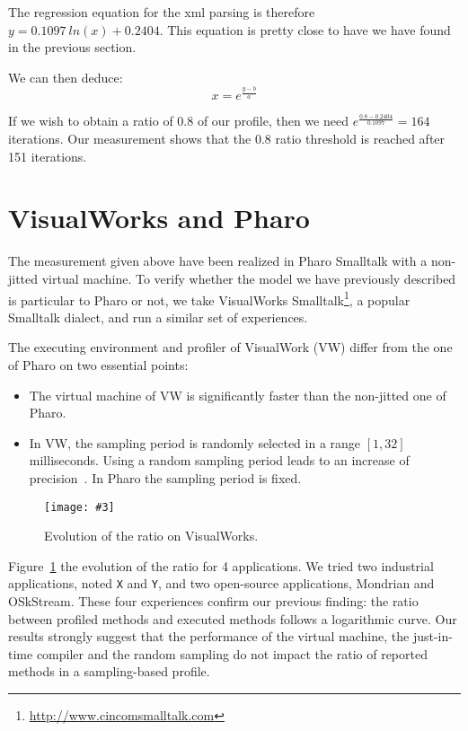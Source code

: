 \documentclass{sig-alternate}
\newcommand{\ct}{\lstinline[backgroundcolor=\color{white},basicstyle=\footnotesize\ttfamily]}
\newcommand{\fig}[4]{
	\begin{figure}[#1]
		\centering
		\texttt{[image: \#3]}
		\caption{\label{fig:#3}#4}
	\end{figure}}
\newcommand{\seclabel}[1]{\label{sec:#1}}
\newcommand{\figref}[1]{Figure~\ref{fig:#1}}
\begin{document}
The regression equation for the xml parsing is therefore $y = 0.1097~ln(x) + 0.2404$. This equation is pretty close to have we have found in the previous section.

We can then deduce:
\[
x = e^{\frac{y-b}{a}}
\]

If we wish to obtain a ratio of 0.8 of our profile, then we need $e^{\frac{0.8 - 0.2404}{0.1097}} = 164$ iterations. Our measurement shows that the 0.8 ratio threshold is reached after 151 iterations.

\section{VisualWorks and Pharo}\seclabel{comparison}

The measurement given above have been realized in Pharo Smalltalk with a non-jitted virtual machine. To verify whether the model we have previously described is particular to Pharo or not, we take VisualWorks Smalltalk\footnote{\url{http://www.cincomsmalltalk.com}}, a popular Smalltalk dialect, and run a similar set of experiences.

The executing environment and profiler of VisualWork (VW) differ from the one of Pharo on two essential points:

\begin{itemize}
\item The virtual machine of VW is significantly faster than the non-jitted one of Pharo. 
\item In VW, the sampling period is randomly selected in a range $[1 , 32]$ milliseconds. Using a random sampling period leads to an increase of precision~\cite{Mytk10a}. In Pharo the sampling period is fixed.
\end{itemize}

\fig{h}{0.5}{IterationEvolutionOnVW}{Evolution of the ratio on VisualWorks.}

\figref{IterationEvolutionOnVW} the evolution of the ratio for 4 applications. We tried two industrial applications, noted \ct{X} and \ct{Y}, and two open-source applications, Mondrian and OSkStream. These four experiences confirm our previous finding: the ratio between profiled methods and executed methods follows a logarithmic curve. Our results strongly suggest that the performance of the virtual machine, the just-in-time compiler and the random sampling do not impact the ratio of reported methods in a sampling-based profile.
\end{document}

